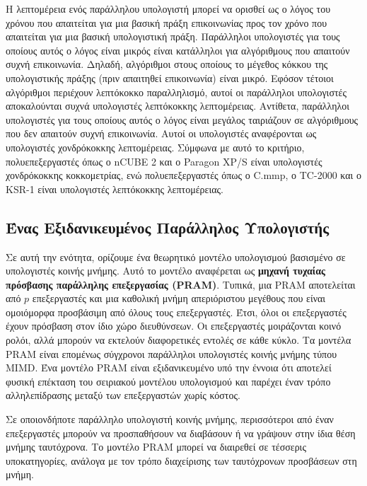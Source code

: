 \documentclass[12pt,a4paper]{article} %
\begin{document}
Η λεπτομέρεια ενός παράλληλου υπολογιστή μπορεί να ορισθεί ως ο λόγος του
χρόνου που απαιτείται για μια βασική πράξη επικοινωνίας προς τον χρόνο που
απαιτείται για μια βασική υπολογιστική πράξη. Παράλληλοι υπολογιστές για τους
οποίους αυτός ο λόγος είναι μικρός είναι κατάλληλοι για αλγόριθμους που απαιτούν
συχνή επικοινωνία. Δηλαδή, αλγόριθμοι στους οποίους το μέγεθος κόκκου της υπολογιστικής
πράξης (πριν απαιτηθεί επικοινωνία) είναι μικρό. Εφόσον τέτοιοι αλγόριθμοι
περιέχουν λεπτόκοκκο παραλληλισμό, αυτοί οι παράλληλοι υπολογιστές αποκαλούνται
συχνά υπολογιστές λεπτόκοκκης λεπτομέρειας. Αντίθετα, παράλληλοι υπολογιστές για
τους οποίους αυτός ο λόγος είναι μεγάλος ταιριάζουν σε αλγόριθμους που δεν
απαιτούν συχνή επικοινωνία. Αυτοί οι υπολογιστές αναφέρονται ως υπολογιστές
χονδρόκοκκης λεπτομέρειας. Σύμφωνα με αυτό το κριτήριο, πολυεπεξεργαστές όπως ο
nCUBE 2 και ο Paragon XP/S είναι υπολογιστές χονδρόκοκκης κοκκομετρίας, ενώ
πολυεπεξεργαστές όπως ο C.mmp, ο TC-2000 και ο KSR-1 είναι υπολογιστές
λεπτόκοκκης λεπτομέρειας.

\subsection{Ένας Εξιδανικευμένος Παράλληλος Υπολογιστής}

Σε αυτή την ενότητα, ορίζουμε ένα θεωρητικό μοντέλο υπολογισμού βασισμένο σε
υπολογιστές κοινής μνήμης. Αυτό το μοντέλο αναφέρεται ως \textbf{μηχανή
τυχαίας πρόσβασης παράλληλης επεξεργασίας (PRAM)}. 
Τυπικά, μια PRAM αποτελείται από $p$ επεξεργαστές 
και μια καθολική μνήμη απεριόριστου μεγέθους που είναι ομοιόμορφα προσβάσιμη 
από όλους τους επεξεργαστές. Έτσι, όλοι οι επεξεργαστές έχουν πρόσβαση στον 
ίδιο χώρο διευθύνσεων. Οι επεξεργαστές μοιράζονται κοινό ρολόι, 
αλλά μπορούν να εκτελούν διαφορετικές εντολές σε κάθε κύκλο. Τα μοντέλα
PRAM είναι επομένως σύγχρονοι παράλληλοι υπολογιστές κοινής μνήμης τύπου MIMD.
Ένα μοντέλο PRAM είναι εξιδανικευμένο υπό την έννοια ότι αποτελεί φυσική επέκταση
του σειριακού μοντέλου υπολογισμού και παρέχει έναν τρόπο αλληλεπίδρασης μεταξύ
των επεξεργαστών χωρίς κόστος.

Σε οποιονδήποτε παράλληλο υπολογιστή κοινής μνήμης, περισσότεροι από έναν
επεξεργαστές μπορούν να προσπαθήσουν να διαβάσουν ή να γράψουν στην ίδια θέση
μνήμης ταυτόχρονα. Το μοντέλο PRAM μπορεί να διαιρεθεί σε τέσσερις υποκατηγορίες,
ανάλογα με τον τρόπο διαχείρισης των ταυτόχρονων προσβάσεων στη μνήμη.
\end{document}
